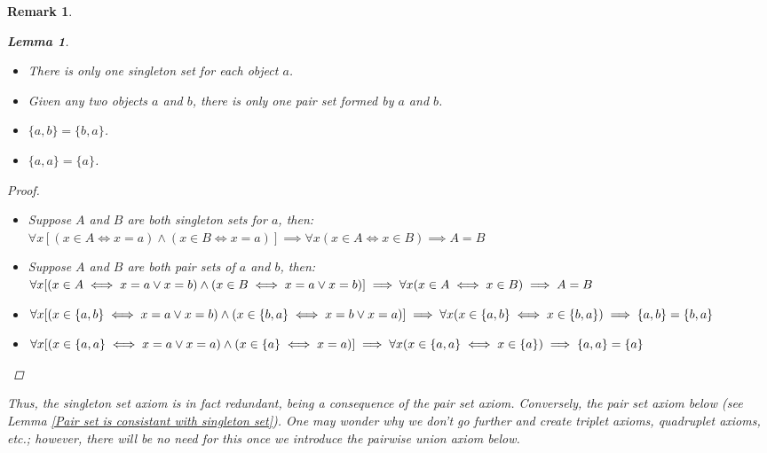 \documentclass[a4paper]{book}
\newtheorem*{proof}{\textit{Proof.}}
\newtheorem{lemma}{Lemma}[section]
\newtheorem{remark}{Remark}[section]
\begin{document}
			\begin{remark}
				\begin{lemma}~
					\begin{itemize}
						\item There is only one singleton set for each object $a$.
						\item Given any two objects $a$ and $b$, there is only one pair set formed by $a$ and $b$.
						\item $\{a,b\}=\{b,a\}$.
						\item $\{a,a\}=\{a\}$.
					\end{itemize}
				\end{lemma}
				\begin{proof}~
					\begin{itemize}
						\item Suppose $A$ and $B$ are both singleton sets for $a$, then:\\
						$\forall x[(x\in A\iff x=a)\land(x\in B\iff x=a)]\implies\forall x(x\in A\iff x\in B)\implies A=B$
						\item Suppose $A$ and $B$ are both pair sets of $a$ and $b$, then:\\
						$\forall x[(x\in A\iff x=a\lor x=b)\land(x\in B\iff x=a\lor x=b)]\implies\forall x(x\in A\iff x\in B)\\\implies A=B$
						\item $\forall x[(x\in \{a,b\}\iff x=a\lor x=b)\land(x\in \{b,a\}\iff x=b\lor x=a)]\\\implies\forall x(x\in \{a,b\}\iff x\in \{b,a\})\implies\{a,b\}=\{b,a\}$
						\item $\forall x[(x\in \{a,a\}\iff x=a\lor x=a)\land(x\in \{a\}\iff x=a)]\\\implies\forall x(x\in\{a,a\}\iff x\in \{a\})\implies\{a,a\}=\{a\}$
					\end{itemize}
				\end{proof}
				Thus, the singleton set axiom is in fact redundant, being a consequence of the pair set axiom. Conversely, the pair set axiom below (see Lemma \ref{Pair set is consistant with singleton set}). One may wonder why we don't go further and create triplet axioms, quadruplet axioms, etc.; however, there will be no need for this once we introduce the pairwise union axiom below.
			\end{remark}
\end{document}
